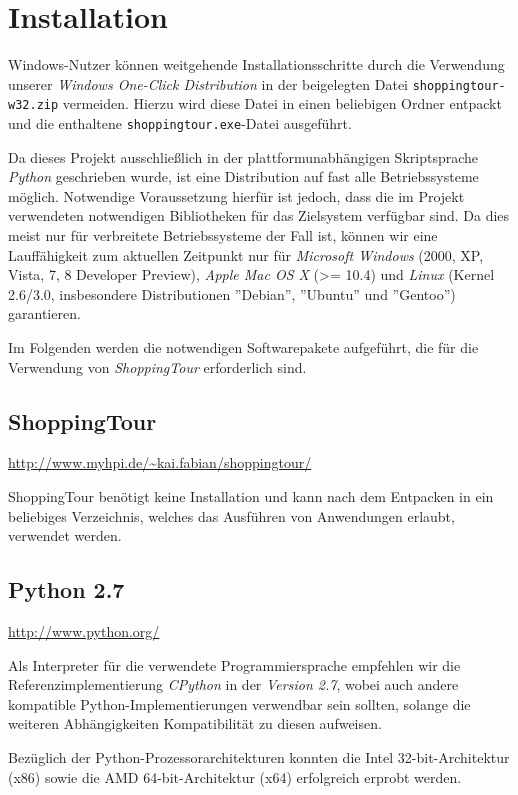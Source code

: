 \section{Installation}
Windows-Nutzer können weitgehende Installationsschritte durch die Verwendung unserer \emph{Windows One-Click Distribution} in der beigelegten Datei \texttt{shoppingtour-w32.zip} vermeiden. Hierzu wird diese Datei in einen beliebigen Ordner entpackt und die enthaltene \texttt{shoppingtour.exe}-Datei ausgeführt.

Da dieses Projekt ausschließlich in der plattformunabhängigen Skriptsprache \emph{Python} geschrieben wurde, ist eine Distribution auf fast alle Betriebssysteme möglich. Notwendige Voraussetzung hierfür ist jedoch, dass die im Projekt verwendeten notwendigen Bibliotheken für das Zielsystem verfügbar sind. Da dies meist nur für verbreitete Betriebssysteme der Fall ist, können wir eine Lauffähigkeit zum aktuellen Zeitpunkt nur für \emph{Microsoft Windows} (2000, XP, Vista, 7, 8 Developer Preview), \emph{Apple Mac OS X} (>= 10.4) und \emph{Linux} (Kernel 2.6/3.0, insbesondere Distributionen ''Debian'', ''Ubuntu'' und ''Gentoo'') garantieren.

Im Folgenden werden die notwendigen Softwarepakete aufgeführt, die für die Verwendung von \emph{ShoppingTour} erforderlich sind.

\subsection{ShoppingTour}
\url{http://www.myhpi.de/~kai.fabian/shoppingtour/}

ShoppingTour benötigt keine Installation und kann nach dem Entpacken in ein beliebiges Verzeichnis, welches das Ausführen von Anwendungen erlaubt, verwendet werden.

\subsection{Python 2.7}
\url{http://www.python.org/}

Als Interpreter für die verwendete Programmiersprache empfehlen wir die Referenzimplementierung \emph{CPython} in der \emph{Version 2.7}, wobei auch andere kompatible Python-Implementierungen verwendbar sein sollten, solange die weiteren Abhängigkeiten Kompatibilität zu diesen aufweisen.

Bezüglich der Python-Prozessorarchitekturen konnten die Intel 32-bit-Architektur (x86) sowie die AMD 64-bit-Architektur (x64) erfolgreich erprobt werden.

